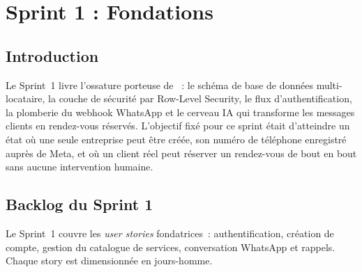 \chapter{Sprint 1 : Fondations}

\section{Introduction}
Le Sprint~1 livre l'ossature porteuse de \nova{}~: le schéma de
base de données multi-locataire, la couche de sécurité par
Row-Level Security, le flux d'authentification, la plomberie du
webhook WhatsApp et le cerveau IA qui transforme les messages
clients en rendez-vous réservés. L'objectif fixé pour ce sprint
était d'atteindre un état où une seule entreprise peut être créée,
son numéro de téléphone enregistré auprès de Meta, et où un client
réel peut réserver un rendez-vous de bout en bout sans aucune
intervention humaine.

\section{Backlog du Sprint 1}
Le Sprint~1 couvre les \emph{user stories} fondatrices~:
authentification, création de compte, gestion du catalogue de
services, conversation WhatsApp et rappels. Chaque story est
dimensionnée en jours-homme.

